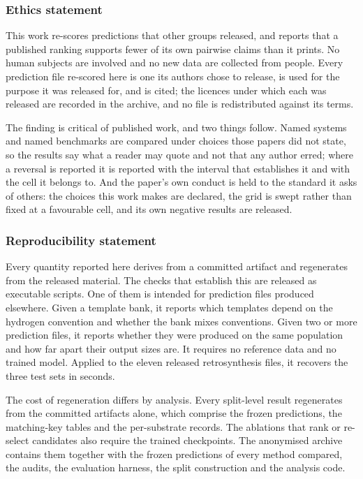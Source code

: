 \documentclass{article}
\begin{document}
\subsubsection*{Ethics statement}

This work re-scores predictions that other groups released, and reports that a published ranking
supports fewer of its own pairwise claims than it prints. No human subjects are involved and no
new data are collected from people. Every prediction file re-scored here is one its authors chose
to release, is used for the purpose it was released for, and is cited; the licences under which
each was released are recorded in the archive, and no file is redistributed against its terms.

The finding is critical of published work, and two things follow. Named systems and named
benchmarks are compared under choices those papers did not state, so the results say what a
reader may quote and not that any author erred; where a reversal is reported it is reported with
the interval that establishes it and with the cell it belongs to. And the paper's own conduct is
held to the standard it asks of others: the choices this work makes are declared, the grid is
swept rather than fixed at a favourable cell, and its own negative results are released.

\subsubsection*{Reproducibility statement}

Every quantity reported here derives from a committed artifact and regenerates from the released
material. The checks that establish this are released as executable scripts. One of them is
intended for prediction files produced elsewhere. Given a template bank, it reports which templates
depend on the hydrogen convention and whether the bank mixes conventions. Given two or more
prediction files, it reports whether they were produced on the same population and how far apart
their output sizes are. It requires no reference data and no trained model. Applied to the
eleven released retrosynthesis files, it recovers the three test sets in seconds.

The cost of regeneration differs by analysis. Every split-level result regenerates from the
committed artifacts alone, which comprise the frozen predictions, the matching-key tables and the
per-substrate records. The ablations that rank or re-select candidates also require the
trained checkpoints. The anonymised archive contains them together with the frozen predictions of
every method compared, the audits, the evaluation harness, the split construction and the analysis
code.
\end{document}
